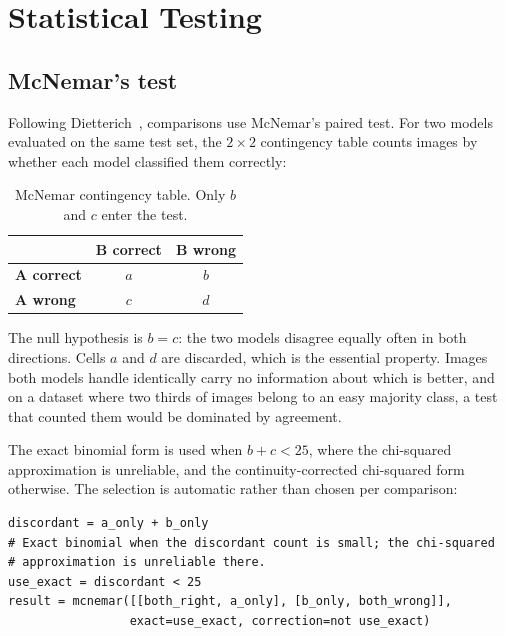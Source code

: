 \section{Statistical Testing}
\label{sec:eval-stats}

\subsection{McNemar's test}

Following Dietterich~\cite{dietterich1998tests}, comparisons use McNemar's paired test.
For two models evaluated on the same test set, the $2 \times 2$ contingency table counts
images by whether each model classified them correctly:

\begin{table}[htbp]
\centering
\caption{McNemar contingency table. Only $b$ and $c$ enter the test.}
\label{tab:mcnemar-table}
\small
\begin{tabular}{@{}lcc@{}}
\toprule
& \textbf{B correct} & \textbf{B wrong} \\
\midrule
\textbf{A correct} & $a$ & $b$ \\
\textbf{A wrong}   & $c$ & $d$ \\
\bottomrule
\end{tabular}
\end{table}

The null hypothesis is $b = c$: the two models disagree equally often in both
directions. Cells $a$ and $d$ are discarded, which is the essential property. Images both
models handle identically carry no information about which is better, and on a dataset
where two thirds of images belong to an easy majority class, a test that counted them
would be dominated by agreement.

The exact binomial form is used when $b + c < 25$, where the chi-squared approximation is
unreliable, and the continuity-corrected chi-squared form otherwise. The selection is
automatic rather than chosen per comparison:

\begin{lstlisting}[caption={Test variant selection, \texttt{scripts/statistical\_tests.py}.},
                   label={lst:mcnemar}]
discordant = a_only + b_only
# Exact binomial when the discordant count is small; the chi-squared
# approximation is unreliable there.
use_exact = discordant < 25
result = mcnemar([[both_right, a_only], [b_only, both_wrong]],
                 exact=use_exact, correction=not use_exact)
\end{lstlisting}

